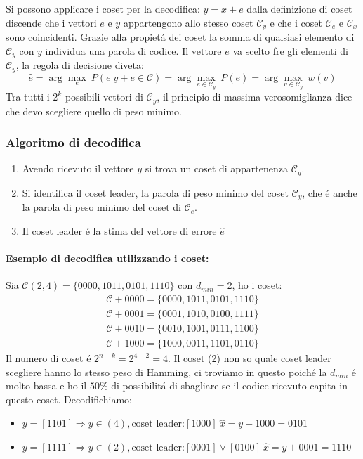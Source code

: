             Si possono applicare i coset per la decodifica: $y=x+e$ dalla definizione di coset discende che i vettori $e$ e $y$
            appartengono allo stesso coset $\mathcal{C}_y$ e che i coset $\mathcal{C}_e$ e $\mathcal{C}_x$ sono coincidenti. Grazie alla propietá
            dei coset la somma di qualsiasi elemento di $\mathcal{C}_y$ con $y$ individua una parola di codice. Il vettore $e$ va scelto fre gli elementi
            di $\mathcal{C}_y$, la regola di decisione diveta:
            \[
                \hat{e} = \arg \underset{e}{\max}\ P(e|y+e\in\mathcal{C}) = \arg \underset{e\in\mathcal{C}_y }{\max}\ P(e) =\arg \underset{v\in\mathcal{C}_y }{\max}\ w(v)
            \] 
            Tra tutti i $2^k$ possibili vettori di $\mathcal{C}_y$, il principio di massima verosomiglianza dice che devo scegliere quello di peso minimo.
        \subsubsection{Algoritmo di decodifica}
            \begin{enumerate}
                \item Avendo ricevuto il vettore $y$ si trova un coset di appartenenza $\mathcal{C}_y$.
                \item {Si identifica il coset leader, la parola di peso minimo del coset $\mathcal{C}_y$, che é anche la parola di peso minimo del 
                coset di $\mathcal{C}_e$.}
                \item Il coset leader é la stima del vettore di errore $\hat{e}$
            \end{enumerate}
            \paragraph{Esempio di decodifica utilizzando i coset:}
                    Sia ${\mathcal{C}(2,4) = \{0000,1011,0101,1110\}}$ con $d_{min} = 2$, ho i coset: 
                \begin{align}
                    \mathcal{C} + 0000 = \{0000,1011,0101,1110\} \\
                    \mathcal{C} + 0001 = \{0001,1010,0100,1111\} \\
                    \mathcal{C} + 0010 = \{0010,1001,0111,1100\} \\
                    \mathcal{C} + 1000 = \{1000,0011,1101,0110\} 
                \end{align}
                Il numero di coset é $2^{n-k} = 2^{4-2} =4$. Il coset (2) non so quale coset leader scegliere hanno lo stesso peso di Hamming, ci
                troviamo in questo poiché la $d_{min}$ é molto bassa e ho il $50\%$ di possibilitá di sbagliare se il codice ricevuto capita in questo coset.
                Decodifichiamo:
                \begin{itemize}
                    \item {$y=[1101]\Rightarrow y\in (4),\text{coset leader:} [1000]\ \hat{x}=y+1000=0101$}
                    \item {$y=[1111]\Rightarrow y\in (2),\text{coset leader:} [0001] \vee [0100] \ \hat{x}=y+0001=1110$}
                \end{itemize}

